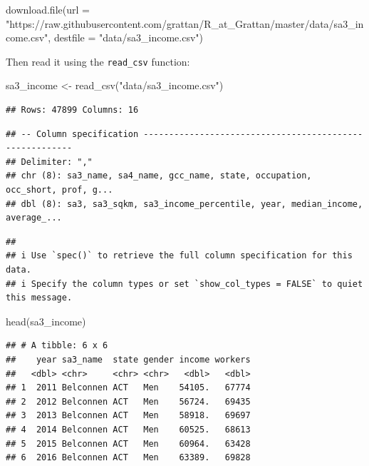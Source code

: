 \documentclass[
]{book}
\newenvironment{Shaded}{\begin{snugshade}}{\end{snugshade}}
\newcommand{\AttributeTok}[1]{\textcolor[rgb]{0.77,0.63,0.00}{#1}}
\newcommand{\FunctionTok}[1]{\textcolor[rgb]{0.00,0.00,0.00}{#1}}
\newcommand{\NormalTok}[1]{#1}
\newcommand{\OtherTok}[1]{\textcolor[rgb]{0.56,0.35,0.01}{#1}}
\newcommand{\StringTok}[1]{\textcolor[rgb]{0.31,0.60,0.02}{#1}}
\begin{document}
\begin{Shaded}
\begin{Highlighting}[]
\FunctionTok{download.file}\NormalTok{(}\AttributeTok{url =} \StringTok{"https://raw.githubusercontent.com/grattan/R\_at\_Grattan/master/data/sa3\_income.csv"}\NormalTok{,}
              \AttributeTok{destfile =} \StringTok{"data/sa3\_income.csv"}\NormalTok{)}
\end{Highlighting}
\end{Shaded}

Then read it using the \texttt{read\_csv} function:

\begin{Shaded}
\begin{Highlighting}[]
\NormalTok{sa3\_income }\OtherTok{\textless{}{-}} \FunctionTok{read\_csv}\NormalTok{(}\StringTok{"data/sa3\_income.csv"}\NormalTok{)}
\end{Highlighting}
\end{Shaded}

\begin{verbatim}
## Rows: 47899 Columns: 16
\end{verbatim}

\begin{verbatim}
## -- Column specification --------------------------------------------------------
## Delimiter: ","
## chr (8): sa3_name, sa4_name, gcc_name, state, occupation, occ_short, prof, g...
## dbl (8): sa3, sa3_sqkm, sa3_income_percentile, year, median_income, average_...
\end{verbatim}

\begin{verbatim}
## 
## i Use `spec()` to retrieve the full column specification for this data.
## i Specify the column types or set `show_col_types = FALSE` to quiet this message.
\end{verbatim}

\begin{Shaded}
\begin{Highlighting}[]
\FunctionTok{head}\NormalTok{(sa3\_income)}
\end{Highlighting}
\end{Shaded}

\begin{verbatim}
## # A tibble: 6 x 6
##    year sa3_name  state gender income workers
##   <dbl> <chr>     <chr> <chr>   <dbl>   <dbl>
## 1  2011 Belconnen ACT   Men    54105.   67774
## 2  2012 Belconnen ACT   Men    56724.   69435
## 3  2013 Belconnen ACT   Men    58918.   69697
## 4  2014 Belconnen ACT   Men    60525.   68613
## 5  2015 Belconnen ACT   Men    60964.   63428
## 6  2016 Belconnen ACT   Men    63389.   69828
\end{verbatim}
\end{document}

